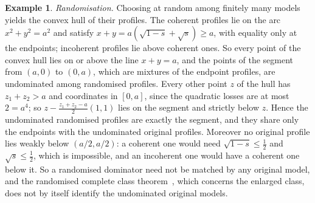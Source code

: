 \documentclass[11pt]{article}
\theoremstyle{definition}
\newtheorem{example}[theorem]{Example}
\theoremstyle{remark}
\begin{document}
\begin{example}
\emph{Randomisation.} Choosing at random among finitely many models yields the convex hull of their profiles. The coherent profiles lie on the arc $x^2+y^2=a^2$ and satisfy $x+y=a(\sqrt{1-s}+\sqrt s)\ge a$, with equality only at the endpoints; incoherent profiles lie above coherent ones. So every point of the convex hull lies on or above the line $x+y=a$, and the points of the segment from $(a,0)$ to $(0,a)$, which are mixtures of the endpoint profiles, are undominated among randomised profiles. Every other point $z$ of the hull has $z_1+z_2>a$ and coordinates in $[0,a]$, since the quadratic losses are at most $2=a^4$; so $z-\frac{z_1+z_2-a}{2}(1,1)$ lies on the segment and strictly below $z$. Hence the undominated randomised profiles are exactly the segment, and they share only the endpoints with the undominated original profiles. Moreover no original profile lies weakly below $(a/2,a/2)$: a coherent one would need $\sqrt{1-s}\le\frac12$ and $\sqrt s\le\frac12$, which is impossible, and an incoherent one would have a coherent one below it. So a randomised dominator need not be matched by any original model, and the randomised complete class theorem~\cite[Theorem~1]{SSSK}, which concerns the enlarged class, does not by itself identify the undominated original models.
\end{example}
\end{document}

